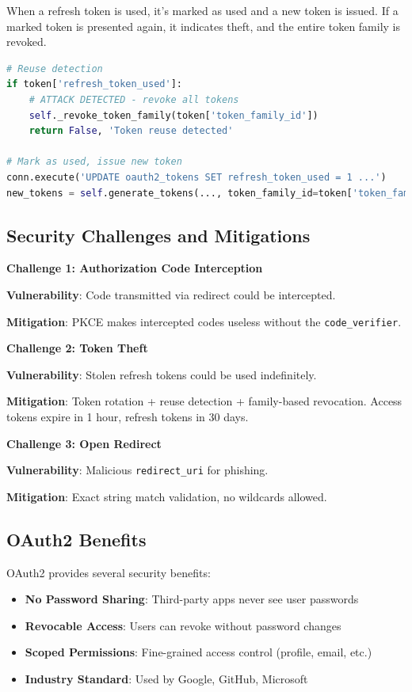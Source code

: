 \documentclass[12pt,a4paper]{article}
\begin{document}
When a refresh token is used, it's marked as used and a new token is issued. If a marked token is presented again, it indicates theft, and the entire token family is revoked.

\begin{lstlisting}[language=Python]
# Reuse detection
if token['refresh_token_used']:
    # ATTACK DETECTED - revoke all tokens
    self._revoke_token_family(token['token_family_id'])
    return False, 'Token reuse detected'

# Mark as used, issue new token
conn.execute('UPDATE oauth2_tokens SET refresh_token_used = 1 ...')
new_tokens = self.generate_tokens(..., token_family_id=token['token_family_id'])
\end{lstlisting}

\subsection{Security Challenges and Mitigations}

\textbf{Challenge 1: Authorization Code Interception}

\textbf{Vulnerability}: Code transmitted via redirect could be intercepted.

\textbf{Mitigation}: PKCE makes intercepted codes useless without the \texttt{code\_verifier}.

\textbf{Challenge 2: Token Theft}

\textbf{Vulnerability}: Stolen refresh tokens could be used indefinitely.

\textbf{Mitigation}: Token rotation + reuse detection + family-based revocation. Access tokens expire in 1 hour, refresh tokens in 30 days.

\textbf{Challenge 3: Open Redirect}

\textbf{Vulnerability}: Malicious \texttt{redirect\_uri} for phishing.

\textbf{Mitigation}: Exact string match validation, no wildcards allowed.

\subsection{OAuth2 Benefits}

OAuth2 provides several security benefits:
\begin{itemize}
    \item \textbf{No Password Sharing}: Third-party apps never see user passwords
    \item \textbf{Revocable Access}: Users can revoke without password changes
    \item \textbf{Scoped Permissions}: Fine-grained access control (profile, email, etc.)
    \item \textbf{Industry Standard}: Used by Google, GitHub, Microsoft
\end{itemize}
\end{document}

